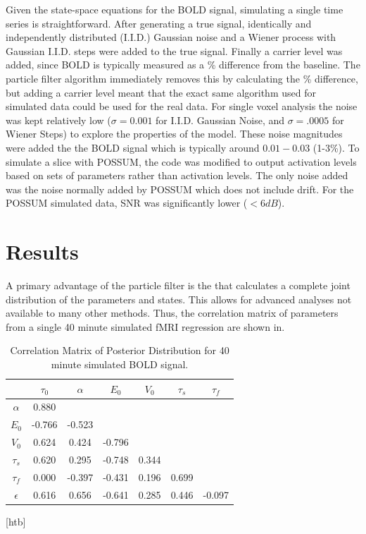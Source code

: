 \documentclass{article}
\begin{document}
Given the state-space equations for the \ac{BOLD} signal, simulating a single time
series is straightforward. After generating a true signal,
identically and independently distributed (I.I.D.) Gaussian noise and a Wiener
process with Gaussian I.I.D. steps were added to the true signal. Finally a
carrier level was added, since \ac{BOLD} is typically
measured as a \% difference from the baseline. The particle filter
algorithm immediately removes this by calculating the \% difference,
but adding a carrier level meant that the exact same algorithm used
for simulated data could be used for the real data. For single voxel
analysis the noise was kept relatively low ($\sigma = 0.001$  for
I.I.D. Gaussian Noise, and $\sigma = .0005$ for Wiener Steps) to
explore the properties of the model. These noise magnitudes were added
the the BOLD signal which is typically around $0.01-0.03$ (1-3\%). 
To simulate a slice with POSSUM, the code was modified to
output activation levels based on sets of parameters rather than
activation levels. The only noise added was the noise normally
added by POSSUM which does not include drift. 
For the POSSUM simulated data, SNR was significantly lower ($<6dB$).

\section{Results}
\label{sec:Results}
A primary advantage of the particle filter is the that calculates
a complete joint distribution of the parameters and states. This 
allows for advanced analyses not available to many other methods.
Thus, the correlation matrix of parameters from a single 40 minute
simulated fMRI regression are shown in. %
\begin{table}[t]
\ninept
  \centering
\begin{tabular}{|c | c  c  c  c  c  c  |}
\hline
  & $\tau_0$ & $\alpha$ & $E_0$    & $V_0$    & $\tau_s$ & $\tau_f$  \\
\hline
$\alpha$                      & 0.880& & & & & \\
\rowcolor[gray]{.8} $E_0$     & -0.766& -0.523& & & & \\
$V_0$                         & 0.624& 0.424& -0.796& & & \\
\rowcolor[gray]{.8} $\tau_s$  & 0.620& 0.295& -0.748& 0.344& & \\
$\tau_f$                      & 0.000& -0.397& -0.431& 0.196& 0.699& \\
\rowcolor[gray]{.8} $\epsilon$& 0.616& 0.656& -0.641& 0.285& 0.446& -0.097\\
\hline
\end{tabular}
  \caption{Correlation Matrix of Posterior Distribution for 40 minute simulated BOLD signal.}
\label{tab:long_corr}
\end{table}[htb]
\normalsize
\end{document}
